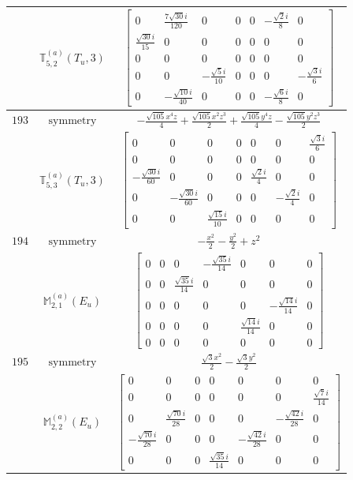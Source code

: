 \documentclass[fleqn,8pt,landscape]{jsarticle}
\begin{document}
\begin{longtable}{ccc}
$  $ & $ \mathbb{T}_{5,2}^{(a)}(T_{u},3) $ & $ \begin{bmatrix} 0 & \frac{7 \sqrt{30} i}{120} & 0 & 0 & 0 & - \frac{\sqrt{2} i}{8} & 0 \\ \frac{\sqrt{30} i}{15} & 0 & 0 & 0 & 0 & 0 & 0 \\ 0 & 0 & 0 & 0 & 0 & 0 & 0 \\ 0 & 0 & - \frac{\sqrt{5} i}{10} & 0 & 0 & 0 & - \frac{\sqrt{3} i}{6} \\ 0 & - \frac{\sqrt{10} i}{40} & 0 & 0 & 0 & - \frac{\sqrt{6} i}{8} & 0 \end{bmatrix} $ \\ \hline
$ 193 $ & $ \text{symmetry} $ & $ - \frac{\sqrt{105} x^{4} z}{4} + \frac{\sqrt{105} x^{2} z^{3}}{2} + \frac{\sqrt{105} y^{4} z}{4} - \frac{\sqrt{105} y^{2} z^{3}}{2} $ \\
$  $ & $ \mathbb{T}_{5,3}^{(a)}(T_{u},3) $ & $ \begin{bmatrix} 0 & 0 & 0 & 0 & 0 & 0 & \frac{\sqrt{3} i}{6} \\ 0 & 0 & 0 & 0 & 0 & 0 & 0 \\ - \frac{\sqrt{30} i}{60} & 0 & 0 & 0 & \frac{\sqrt{2} i}{4} & 0 & 0 \\ 0 & - \frac{\sqrt{30} i}{60} & 0 & 0 & 0 & - \frac{\sqrt{2} i}{4} & 0 \\ 0 & 0 & \frac{\sqrt{15} i}{10} & 0 & 0 & 0 & 0 \end{bmatrix} $ \\ \hline
$ 194 $ & $ \text{symmetry} $ & $ - \frac{x^{2}}{2} - \frac{y^{2}}{2} + z^{2} $ \\
$  $ & $ \mathbb{M}_{2,1}^{(a)}(E_{u}) $ & $ \begin{bmatrix} 0 & 0 & 0 & - \frac{\sqrt{35} i}{14} & 0 & 0 & 0 \\ 0 & 0 & \frac{\sqrt{35} i}{14} & 0 & 0 & 0 & 0 \\ 0 & 0 & 0 & 0 & 0 & - \frac{\sqrt{14} i}{14} & 0 \\ 0 & 0 & 0 & 0 & \frac{\sqrt{14} i}{14} & 0 & 0 \\ 0 & 0 & 0 & 0 & 0 & 0 & 0 \end{bmatrix} $ \\ \hline
$ 195 $ & $ \text{symmetry} $ & $ \frac{\sqrt{3} x^{2}}{2} - \frac{\sqrt{3} y^{2}}{2} $ \\
$  $ & $ \mathbb{M}_{2,2}^{(a)}(E_{u}) $ & $ \begin{bmatrix} 0 & 0 & 0 & 0 & 0 & 0 & 0 \\ 0 & 0 & 0 & 0 & 0 & 0 & \frac{\sqrt{7} i}{14} \\ 0 & \frac{\sqrt{70} i}{28} & 0 & 0 & 0 & - \frac{\sqrt{42} i}{28} & 0 \\ - \frac{\sqrt{70} i}{28} & 0 & 0 & 0 & - \frac{\sqrt{42} i}{28} & 0 & 0 \\ 0 & 0 & 0 & \frac{\sqrt{35} i}{14} & 0 & 0 & 0 \end{bmatrix} $ \\ \hline

\end{longtable}
\end{document}
